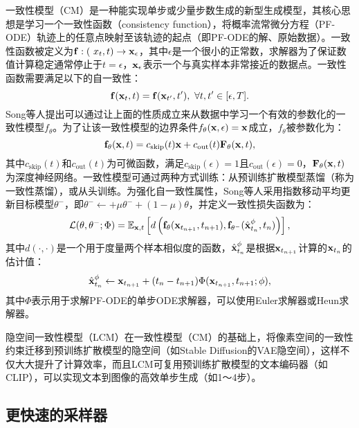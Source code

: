 \documentclass[11pt,a4paper,UTF8]{ctexart}
\begin{document}
一致性模型（CM）是一种能实现单步或少量步数生成的新型生成模型，其核心思想是学习一个一致性函数（consistency function），将概率流常微分方程（PF-ODE）轨迹上的任意点映射至该轨迹的起点（即PF-ODE的解、原始数据）。一致性函数被定义为$\mathbf{f}:(\
x_t,t)\rightarrow \mathbf{x}_\epsilon$，其中$\epsilon$是一个很小的正常数，求解器为了保证数值计算稳定通常停止于$t=\epsilon$，$\mathbf{x}_\epsilon$表示一个与真实样本非常接近的数据点。一致性函数需要满足以下的自一致性：
\begin{equation*}
    \f(\x_t,t)=\f(\x_{t^{\prime}},t^{\prime}),\ \forall t,t^\prime\in [\epsilon,T]. 
\end{equation*}
Song等人\cite{pmlr-v202-song23a}提出可以通过让上面的性质成立来从数据中学习一个有效的参数化的一致性模型$f_\theta$。为了让该一致性模型的边界条件$f_\theta(\mathbf{x},\epsilon)=\mathbf{x}$成立，$f_\theta$被参数化为：
\begin{equation*}
    \mathbf{f}_\theta(\mathbf{x},t)=c_{\text{skip}}(t)\mathbf{x} + c_{\text{out}}(t)\mathbf{F}_\theta(\mathbf{x},t),
\end{equation*}
其中$c_{\text{skip}}(t)$和$c_{\text{out}}(t)$为可微函数，满足$c_{\text{skip}}(\epsilon)=1$且$c_{\text{out}}(\epsilon)=0$，$\mathbf{F}_\theta(\mathbf{x},t)$为深度神经网络。一致性模型可通过两种方式训练：从预训练扩散模型蒸馏（称为一致性蒸馏），或从头训练。为强化自一致性属性，Song等人采用指数移动平均更新目标模型$\theta^-$，即$\theta^- \leftarrow + \mu\theta^- + (1-\mu)\theta$，并定义一致性损失函数为：
\begin{equation*}
    \mathcal{L}(\theta,\theta^-;\Phi)=\mathbb{E}_{\mathbf{x},t}\left[d\left(\mathbf{f}_\theta(\mathbf{x}_{t_{n+1}},t_{n+1}),\mathbf{f}_{\theta^-}(\hat{\mathbf{x}}_{t_n}^\phi,t_n) \right)\right],
\end{equation*}
其中$d(\cdot,\cdot)$是一个用于度量两个样本相似度的函数，$\hat{\mathbf{x}}_{t_n}^\phi$是根据$\mathbf{x}_{t_{n+1}}$计算的$\mathbf{x}_{t_{n}}$的估计值：
\begin{equation*}
    \hat{\mathbf{x}}_{t_n}^\phi \leftarrow \mathbf{x}_{t_{n+1}} + (t_n-t_{n+1})\Phi(\mathbf{x}_{t_{n+1}},t_{n+1};\phi),
\end{equation*}
其中$\Phi$表示用于求解PF-ODE的单步ODE求解器，可以使用Euler求解器\cite{song2020score}或Heun求解器\cite{karras2022elucidating}。


隐空间一致性模型（LCM）\cite{luo2023latent}在一致性模型（CM）的基础上，将像素空间的一致性约束迁移到预训练扩散模型的隐空间（如Stable Diffusion的VAE隐空间），这样不仅大大提升了计算效率，而且LCM可复用预训练扩散模型的文本编码器（如CLIP），可以实现文本到图像的高效单步生成（如1～4步）。


\subsection{更快速的采样器}
\end{document}
